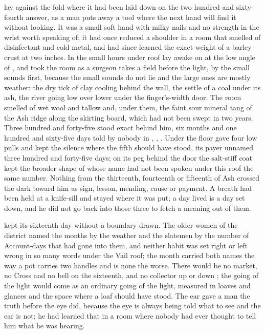 
 lay against the fold where it had been laid down on the two hundred and sixty-fourth answer, as a man puts away a tool where the next hand will find it without looking. It was a small soft hand with milky nails and no strength in the wrist worth speaking of; it had once reduced a shoulder in a room that smelled of disinfectant and cold metal, and had since learned the exact weight of a barley crust at two inches. In the small hours under  roof  lay awake on  at the low angle of , and took the room as a surgeon takes a field before the light, by the small sounds first, because the small sounds do not lie and the large ones are mostly weather: the dry tick of clay cooling behind the wall, the settle of a coal under its ash, the river going low over lower under the finger's-width door. The room smelled of wet wool and tallow and, under them, the faint sour mineral tang of the Ash ridge along the skirting board, which had not been swept in two years. Three hundred and forty-five stood exact behind him, six months and one hundred and sixty-five days told by nobody in , , . Under the floor  gave four low pulls and kept the silence where the fifth should have stood, its payer unnamed three hundred and forty-five days; on its peg behind the door the salt-stiff coat kept the broader shape of  whose name had not been spoken under this roof the same number. Nothing from the thirteenth, fourteenth or fifteenth of Ash crossed the dark toward him as sign, lesson, mending, cause or payment. A breath had been held at a knife-sill and stayed where it was put; a day lived is a day set down, and he did not go back into those three to fetch a meaning out of them.

 kept its sixteenth day without a boundary drawn. The older women of the district named the months by the weather and the slatemen by the number of Account-days that had gone into them, and neither habit was set right or left wrong in so many words under the Vail roof; the month carried both names the way a pot carries two handles and is none the worse. There would be no market, no Cross and no bell on the sixteenth, and no collector up or down ; the going of the light would come as an ordinary going of the light, measured in loaves and glances and the space where a loaf should have stood. The ear gave a man the truth before the eye did, because the eye is always being told what to see and the ear is not; he had learned that in a room where nobody had ever thought to tell him what he was hearing.

